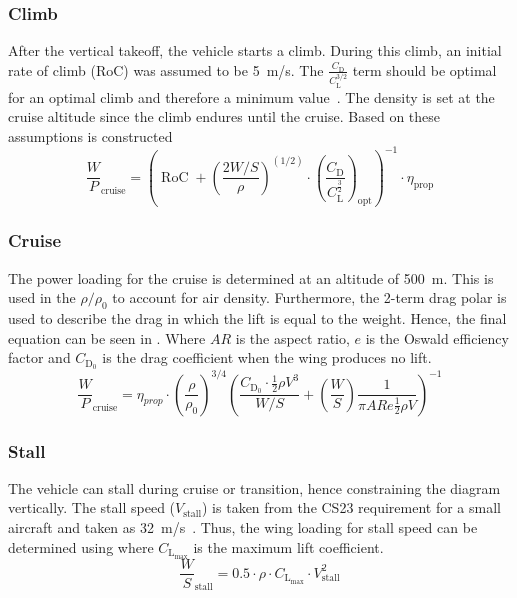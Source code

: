 \subsubsection{Climb}
After the vertical takeoff, the vehicle starts a climb.
During this climb, an initial rate of climb (RoC) was assumed to be \qty{5}{m/s}.
The $\frac{C_{\text{D}}}{C_{\text{L}}^{3/2}}$ term should be optimal for an optimal climb and therefore a minimum value~\cite{ADSEEIslides}.
The density is set at the cruise altitude since the climb endures until the cruise. Based on these assumptions  is constructed
\begin{equation}
    \label{eq:climb}
    \frac{W}{P}_{\text{cruise}} = \left(  \operatorname{RoC} +  \left( \frac{2W/S}{\rho}\right)^{(1/2)} \cdot  \left( \frac{C_{\text{D}}}{C_{\text{L}}^\frac{3}{2}}\right )_{\text{opt}} \right)^{-1} \cdot  \eta_{\text{prop}}
\end{equation}

\subsubsection{Cruise}
The power loading for the cruise is determined at an altitude of   \qty{500}{m}.
This is used in the $\rho/\rho_{0}$ to account for air density.
Furthermore, the 2-term drag polar is used to describe the drag in which the lift is equal to the weight.
Hence, the final equation can be seen in . Where $AR$ is the aspect ratio, $e$ is the Oswald efficiency factor and $C_{\text{D}_{0}}$ is the drag coefficient when the wing produces no lift.
\begin{equation}
    \label{eq:WPcruise}
    \frac{W}{P}_{\text{cruise}} = \eta_{prop} \cdot  \left( \frac{\rho}{\rho_{0}} \right )^{3/4} \left ( \frac{C_{\text{D}_{0}}\cdot \frac{1}{2}\rho V^3} {W/S} + \left( \frac{W}{S} \right) \frac{1}{\pi AR e \frac{1}{2} \rho V} \right) ^{-1}
\end{equation}

\subsubsection{Stall}
The vehicle can stall during cruise or transition, hence constraining the diagram vertically.
The stall speed ($V_{\text{stall}}$) is taken from the CS23 requirement for a small aircraft and taken as \qty{32}{m/s}~\cite{easa_cs23_2020}. Thus, the wing loading for stall speed can be determined using  where $C_{\text{L}_{\max}}$ is the maximum lift coefficient.
\begin{equation}
    \label{eq:stall}
    \frac{W}{S}_{\text{stall}} = 0.5\cdot \rho\cdot C_{\text{L}_{\max}}\cdot V_{\text{stall}}^2
\end{equation}

